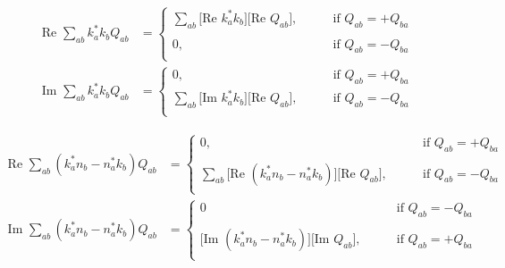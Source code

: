 \begin{align*}
   \text{Re }\sum_{ab} k^*_a k_b Q_{ab} 
&=\begin{cases}
    \sum_{ab} 
    \Big[\text{Re }k_a^* k_b\Big]\Big[\text{Re }Q_{ab}\Big],
    \qquad &\text{if } Q_{ab} = +Q_{ba} \\
\\
    0,
    \qquad &\text{if } Q_{ab} = -Q_{ba} \\
  \end{cases}
\\
   \text{Im }\sum_{ab} k^*_a k_b Q_{ab} 
&=\begin{cases}
    0, \qquad &\text{if } Q_{ab} = +Q_{ba} 
\\
    \sum_{ab} 
    \Big[\text{Im }k_a^* k_b\Big]\Big[\text{Re }Q_{ab}\Big],
    \qquad &\text{if } Q_{ab} = -Q_{ba} \\
  \end{cases}
\end{align*}

\begin{align*}
   \text{Re }\sum_{ab} (k^*_a n_b-n_a^* k_b) Q_{ab}
&=\begin{cases}
    0, 
    \qquad &\text{if } Q_{ab} = +Q_{ba} \\
\\
    \sum_{ab}
    \Big[\text{Re }(k_a^* n_b - n_a^* k_b)\Big]\Big[\text{Re }Q_{ab}\Big],
    \qquad &\text{if } Q_{ab} = -Q_{ba} \\
  \end{cases}
\\[10pt]
   \text{Im }\sum_{ab} (k^*_a n_b-n_a^* k_b) Q_{ab}
&=\begin{cases}
    0
    \qquad &\text{if } Q_{ab} = -Q_{ba} \\
\\
    \Big[\text{Im }(k_a^* n_b - n_a^* k_b)\Big]\Big[\text{Im }Q_{ab}\Big],
    \qquad &\text{if } Q_{ab} = +Q_{ba} \\
  \end{cases}
\end{align*}


